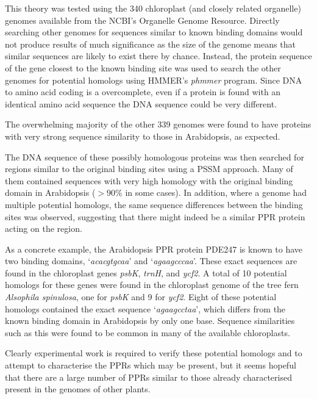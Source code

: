 This theory was tested using the 340 chloroplast (and closely related
organelle)
genomes available from the NCBI's Organelle Genome Resource.
Directly searching other genomes for sequences similar to known binding domains
would not produce results of much significance as the size of the genome means
that similar sequences are likely to exist there by chance.
Instead, the protein sequence of the gene closest to the known binding site was 
used to search the other genomes for potential homologs using HMMER's
\emph{phmmer} program.
Since DNA to amino acid coding is a overcomplete, even if a protein is found
with an identical amino acid sequence the DNA sequence could be very different.

The overwhelming majority of the other 339 genomes were found to have proteins 
with very strong sequence similarity to those in Arabidopsis, as expected. 

The DNA sequence of these possibly homologous proteins was then searched for 
regions similar to the original binding sites using a PSSM approach.
Many of them contained sequences with very high homology
with the original binding domain in Arabidopsis ($>90\%$ in some cases).
In addition, where a genome had multiple potential homologs, the same sequence
differences between the binding sites was observed, suggesting that there might
indeed be a similar PPR protein acting on the region.

As a concrete example, the Arabidopsis PPR protein PDE247 is known to have two 
binding domains, `\emph{acacgtgcaa}' and `\emph{agaagcccaa}'.
These exact sequences are found in the chloroplast genes \emph{psbK}, 
\emph{trnH}, and \emph{ycf2}.
A total of 10 potential homologs for these genes were found in the chloroplast
genome of the tree fern \emph{Alsophila spinulosa}, one for \emph{psbK} and 9
for \emph{ycf2}.
Eight of these potential homologs contained the exact sequence 
`\emph{agaagcctaa}', which differs from the known binding domain in Arabidopsis
by only one base.
Sequence similarities such as this were found to be common in many of the
available chloroplasts.

Clearly experimental work is required to verify these potential homologs and to
attempt to characterise the PPRs which may be present, but it seems hopeful
that there are a large number of PPRs similar to those already characterised
present in the genomes of other plants.


